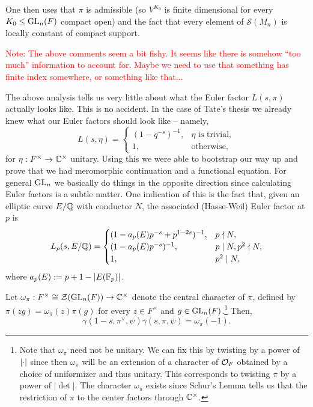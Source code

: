 \documentclass[11pt]{article}
\renewcommand{\S}{\mathscr{S}}
\begin{document}
One then uses that $\pi$ is admissible (so $V^{K_0}$ is finite dimensional for every $K_0\leq\textup{GL}_n(F)$ compact open) and the fact that every element of $\S(M_n)$ is locally constant of compact support.

\textcolor{red}{Note: The above comments seem a bit fishy. It seems like there is somehow ``too much'' information to account for. Maybe we need to use that something has finite index somewhere, or something like that...}

\begin{remark}
The above analysis tells us very little about what the Euler factor $L(s,\pi)$ actually looks like. This is no accident. In the case of Tate's thesis we already knew what our Euler factors should look like -- namely, 
\begin{equation*}
L(s,\eta)=
\begin{cases}
(1-q^{-s})^{-1}, & \eta\textrm{ is trivial}, \\
1, & \textrm{otherwise},
\end{cases}
\end{equation*}
for $\eta: F^{\times}\to\mathbb{C}^{\times}$ unitary. Using this we were able to bootstrap our way up and prove that we had meromorphic continuation and a functional equation. For general $\textup{GL}_n$ we basically do things in the opposite direction since calculating Euler factors is a subtle matter. One indication of this is the fact that, given an elliptic curve $E/\mathbb{Q}$ with conductor $N$, the associated (Hasse-Weil) Euler factor at $p$ is 
\begin{equation*}
L_p(s,E/\mathbb{Q})=
\begin{cases}
(1-a_p(E)p^{-s}+p^{1-2s})^{-1}, & p\nmid N, \\
(1-a_p(E)p^{-s})^{-1}, & p\mid N,p^2\nmid N, \\
1, & p^2\mid N,
\end{cases}
\end{equation*}
where $a_p(E):=p+1-|E(\mathbb{F}_p)|$.
\end{remark}

\begin{corollary}
Let $\omega_{\pi}: F^{\times}\cong\mathcal{Z}(\textup{GL}_n(F))\to\mathbb{C}^{\times}$ denote the central character of $\pi$, defined by $\pi(zg)=\omega_{\pi}(z)\pi(g)$ for every $z\in F^{\times}$ and $g\in\textup{GL}_n(F)$.\footnote{Note that $\omega_{\pi}$ need not be unitary. We can fix this by twisting by a power of $\left\lvert\cdot\right\rvert$ since then $\omega_{\pi}$ will be an extension of a character of $\mathcal{O}_F$ obtained by a choice of uniformizer and thus unitary. This corresponds to twisting $\pi$ by a power of $|\det|$. The character $\omega_{\pi}$ exists since Schur's Lemma tells us that the restriction of $\pi$ to the center factors through $\mathbb{C}^{\times}$.} Then, 
$$\gamma(1-s,\pi^{\vee},\psi)\gamma(s,\pi,\psi)=\omega_{\pi}(-1).$$
\end{corollary}
\end{document}
